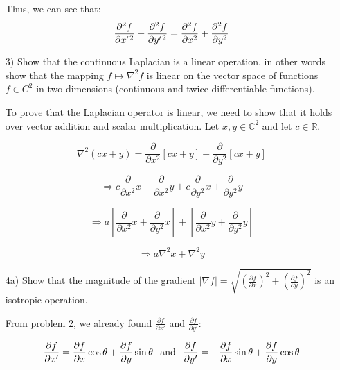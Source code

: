 \documentclass{article}
\begin{document}
\begin{enumerate}
Thus, we can see that:
$$ \frac{\partial^2 f}{\partial x' \hspace{.2mm} ^2} + \frac{\partial^2 f}{\partial y' \hspace{.2mm} ^2} =  \frac{\partial^2 f}{\partial x^2} + \frac{\partial^2 f}{\partial y ^2}$$

\item[3)] Show that the continuous Laplacian is a linear operation, in other words show that the mapping $f\mapsto \nabla^2f$ is linear on the vector space 
of functions $f\in C^2$ in two dimensions (continuous and twice differentiable functions). 

To prove that the Laplacian operator is linear, we need to show that it holds over vector addition and scalar multiplication. Let $x,y \in \mathbb{C} ^ 2$ and let $c \in \mathbb{R}$.

\begin{equation}
\nabla^2 (cx + y)  = \frac{\partial}{\partial x^2} \left[ cx + y \right] + \frac{\partial}{\partial y^2} \left[ cx + y \right]
\end{equation}

\begin{equation}
\Rightarrow c \frac{\partial}{\partial x^2} x + \frac{\partial}{\partial x^2} y + c \frac{\partial}{\partial y^2} x + \frac{\partial}{\partial y^2} y
\end{equation}

\begin{equation}
\Rightarrow a \left[ \frac{\partial}{\partial x^2} x + \frac{\partial}{\partial y^2} x \right] + \left[ \frac{\partial}{\partial x^2} y + \frac{\partial}{\partial y^2} y \right]
\end{equation}

\begin{equation}
\Rightarrow a \nabla^2 x + \nabla^2 y
\end{equation}

\item[4a)] Show that the magnitude of the gradient $|\nabla f|=\sqrt{(\frac{\partial f}{\partial x})^2+(\frac{\partial f}{\partial y})^2}$ is an isotropic operation. 

From problem 2, we already found {\Large$\frac{\partial f}{\partial x'}$} and {\Large$\frac{\partial f}{\partial y'}$}:

\begin{equation}
\frac{\partial f}{\partial x'} = \frac{\partial f}{\partial x} \cos\theta  + \frac{\partial f}{\partial y} \sin\theta \hspace{0.1in} \text{and} \hspace{0.1in} \frac{\partial f}{\partial y'}= -\frac{\partial f}{\partial x} \sin\theta + \frac{\partial f}{\partial y}\cos\theta 
\end{equation}


\end{enumerate}
\end{document}
